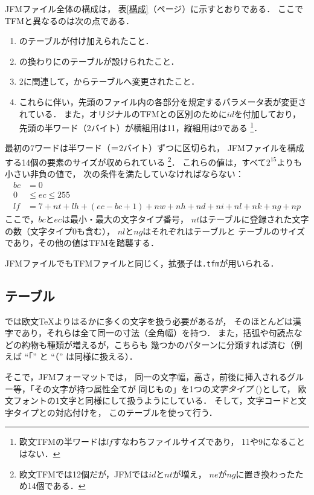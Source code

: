 \documentclass[a4paper,11pt,nomag]{jsarticle}
\def\size#1{\mathit{#1}}
\def\code#1{\texttt{#1}}
\begin{document}
JFMファイル全体の構成は，
表\ref{構成}（\pageref{構成}ページ）に示すとおりである．
ここでTFMと異なるのは次の点である．
\begin{enumerate}
\item {}のテーブルが付け加えられたこと．
\item {}の換わりにのテーブルが設けられたこと．
\item 2に関連して，からテーブルへ変更されたこと．
\item これらに伴い，先頭のファイル内の各部分を規定するパラメータ表が変更されている．
  また，オリジナルのTFMとの区別のために$\size{id}$を付加しており，
  先頭の半ワード（2バイト）が横組用は11，縦組用は9である
  \footnote{欧文TFMの半ワードは$\size{lf}$すなわちファイルサイズであり，
  11や9になることはない．}．
\end{enumerate}
最初の7ワードは半ワード（＝2バイト）ずつに区切られ，
JFMファイルを構成する14個の要素のサイズが収められている
\footnote{欧文TFMでは12個だが，JFMでは$\size{id}$と$\size{nt}$が増え，
$\size{ne}$が$\size{ng}$に置き換わったため14個である．}．
これらの値は，すべて$2^{15}$よりも小さい非負の値で，
次の条件を満たしていなければならない：
\begin{align*}
\size{bc} &= 0 \\
0 &\leq \size{ec} \leq 255 \\
\size{lf} &= 7+\size{nt}+\size{lh}+(\size{ec}-\size{bc}+1)+\size{nw}+\size{nh}
               +\size{nd}+\size{ni}+\size{nl}+\size{nk}+\size{ng}+\size{np}
\end{align*}
ここで，$\size{bc}$と$\size{ec}$は最小・最大の文字タイプ番号，
$\size{nt}$はテーブルに登録された文字の数（文字タイプ0も含む），
$\size{nl}$と$\size{ng}$はそれぞれはテーブルと
テーブルのサイズであり，その他の値はTFMを踏襲する．

JFMファイルでもTFMファイルと同じく，拡張子は\code{.tfm}が用いられる．

\subsection{テーブル}
\pTeX では欧文\TeX よりはるかに多くの文字を扱う必要があるが，
そのほとんどは漢字であり，それらは全て同一の寸法（全角幅）を持つ．
また，括弧や句読点などの約物も種類が増えるが，こちらも
幾つかのパターンに分類すれば済む（例えば ``「'' と ``（'' は同様に扱える）．

そこで，JFMフォーマットでは，
同一の文字幅，高さ，前後に挿入されるグルー等，「その文字が持つ属性全てが
同じもの」を1つの\emph{文字タイプ} ()として，
欧文フォントの1文字と同様にして扱うようにしている．
そして，文字コードと文字タイプとの対応付けを，
このテーブルを使って行う．
\end{document}
